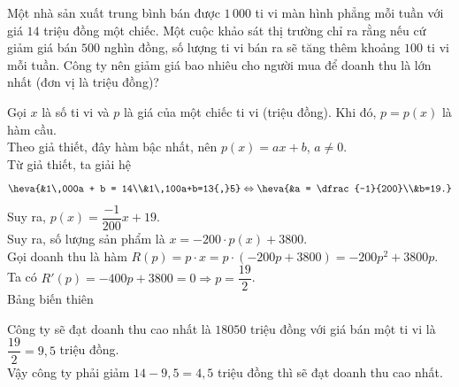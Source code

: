 \begin{bt}%

	Một nhà sản xuất trung bình bán được $1\,000$ ti vi màn hình phẳng mỗi tuần với giá $14$ triệu đồng một chiếc. Một cuộc khảo sát thị trường chỉ ra rằng nếu cứ giảm giá bán $500$ nghìn đồng, số lượng ti vi bán ra sẽ tăng thêm khoảng $100$ ti vi mỗi tuần. Công ty nên giảm giá bao nhiêu cho người mua để doanh thu là lớn nhất (đơn vị là triệu đồng)?
	
	\loigiai
	{
		Gọi $x$ là số ti vi và $p$ là giá của một chiếc ti vi (triệu đồng). Khi đó, $p=p(x)$ là hàm cầu.\\
		Theo giả thiết, đây hàm bậc nhất, nên $p(x) = ax + b$, $a \ne 0$.\\
		Từ giả thiết, ta giải hệ
		$$\heva{&1\,000a + b = 14\\&1\,100a+b=13{,}5} \Leftrightarrow \heva{&a = \dfrac{-1}{200}\\&b=19.}$$
		Suy ra, $p(x) = \dfrac{-1}{200}x + 19$.\\
		Suy ra, số lượng sản phẩm là $x = -200\cdot p(x) + 3800$.\\
		Gọi doanh thu là hàm $R(p) = p\cdot x = p\cdot\left(-200p + 3800\right) = -200p^2+3800p$.\\
		Ta có $R'(p) = -400p + 3800 = 0 \Rightarrow p = \dfrac{19}{2}$.\\
		Bảng biến thiên
		\begin{center}
			\begin{center}
			\end{center}
		\end{center}
		Công ty sẽ đạt doanh thu cao nhất là $18050$ triệu đồng với giá bán một ti vi là $\dfrac{19}{2} = 9{,}5$ triệu đồng.\\
		Vậy công ty phải giảm $14-9{,}5 = 4{,}5$ triệu đồng thì sẽ đạt doanh thu cao nhất.
	}
\end{bt}

